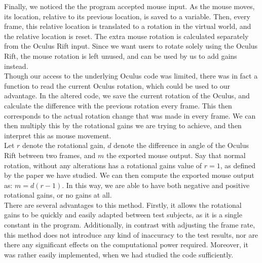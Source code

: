 Finally, we noticed the the program accepted mouse input.
As the mouse moves, its location, relative to its previous location, is saved to a variable.
Then, every frame, this relative location is translated to a rotation in the virtual world, and the relative location is reset.
The extra mouse rotation is calculated separately from the Oculus Rift input.
Since we want users to rotate solely using the Oculus Rift, the mouse rotation is left unused, and can be used by us to add gains instead. \\
Though our access to the underlying Oculus code was limited, there was in fact a function to read the current Oculus rotation, which could be used to our advantage.
In the altered code, we save the current rotation of the Oculus, and calculate the difference with the previous rotation every frame.
This then corresponds to the actual rotation change that was made in every frame.
We can then multiply this by the rotational gains we are trying to achieve, and then interpret this as mouse movement. \\
Let $r$ denote the rotational gain, $d$ denote the difference in angle of the Oculus Rift between two frames, and $m$ the exported mouse output.
Say that normal rotation, without any alterations has a rotational gains value of $r = 1$, as defined by the paper we have studied.
We can then compute the exported mouse output as: $m = d(r - 1)$.
In this way, we are able to have both negative and positive rotational gains, or no gains at all. \\
There are several advantages to this method.
Firstly, it allows the rotational gains to be quickly and easily adapted between test subjects, as it is a single constant in the program.
Additionally, in contrast with adjusting the frame rate, this method does not introduce any kind of inaccuracy to the test results, nor are there any significant effects on the computational power required.
Moreover, it was rather easily implemented, when we had studied the code sufficiently. \\

